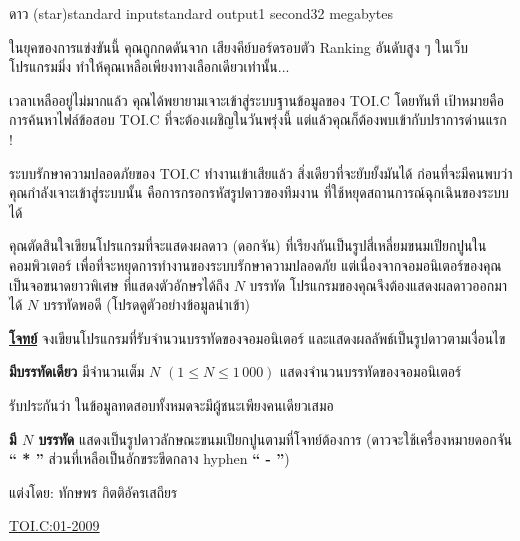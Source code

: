 \documentclass[11pt,a4paper]{article}
\begin{document}
\begin{problem}{ดาว (star)}{standard input}{standard output}{1 second}{32 megabytes}

 ในยุคของการแข่งขันนี้ คุณถูกกดดันจาก เสียงคีย์บอร์ดรอบตัว Ranking อันดับสูง ๆ ในเว็บโปรแกรมมิ่ง ทำให้คุณเหลือเพียงทางเลือกเดียวเท่านั้น...

            เวลาเหลืออยู่ไม่มากแล้ว คุณได้พยายามเจาะเข้าสู่ระบบฐานข้อมูลของ TOI.C โดยทันที เป้าหมายคือการค้นหาไฟล์ข้อสอบ TOI.C ที่จะต้องเผชิญในวันพรุ่งนี้ แต่แล้วคุณก็ต้องพบเข้ากับปราการด่านแรก !

            ระบบรักษาความปลอดภัยของ TOI.C ทำงานเข้าเสียแล้ว สิ่งเดียวที่จะยับยั้งมันได้ ก่อนที่จะมีคนพบว่าคุณกำลังเจาะเข้าสู่ระบบนั้น คือการกรอกรหัสรูปดาวของทีมงาน ที่ใช้หยุดสถานการณ์ฉุกเฉินของระบบได้

            คุณตัดสินใจเขียนโปรแกรมที่จะแสดงผลดาว (ดอกจัน) ที่เรียงกันเป็นรูปสี่เหลี่ยมขนมเปียกปูนในคอมพิวเตอร์ เพื่อที่จะหยุดการทำงานของระบบรักษาความปลอดภัย แต่เนื่องจากจอมอนิเตอร์ของคุณเป็นจอขนาดยาวพิเศษ ที่แสดงตัวอักษรได้ถึง $N$ บรรทัด โปรแกรมของคุณจึงต้องแสดงผลดาวออกมาได้ $N$ บรรทัดพอดี (โปรดดูตัวอย่างข้อมูลนำเข้า)

\underline{\textbf{โจทย์}} จงเขียนโปรแกรมที่รับจำนวนบรรทัดของจอมอนิเตอร์ และแสดงผลลัพธ์เป็นรูปดาวตามเงื่อนไข

\InputFile

\textbf{มีบรรทัดเดียว} มีจำนวนเต็ม $N$ $(1 \leq N \leq 1\,000)$ แสดงจำนวนบรรทัดของจอมอนิเตอร์

รับประกันว่า ในข้อมูลทดสอบทั้งหมดจะมีผู้ชนะเพียงคนเดียวเสมอ

\OutputFile

\textbf{มี $N$ บรรทัด} แสดงเป็นรูปดาวลักษณะขนมเปียกปูนตามที่โจทย์ต้องการ (ดาวจะใช้เครื่องหมายดอกจัน \textbf{“ * ”} ส่วนที่เหลือเป็นอักขระขีดกลาง hyphen \textbf{“ - ”})

\Examples

\begin{example}
%
%
%
\end{example}


\Source

แต่งโดย: ทักษพร กิตติอัครเสถียร 

\href{http://thailandoi.org/toi.c/01-2009}{TOI.C:01-2009} 

\end{problem}
\end{document}

